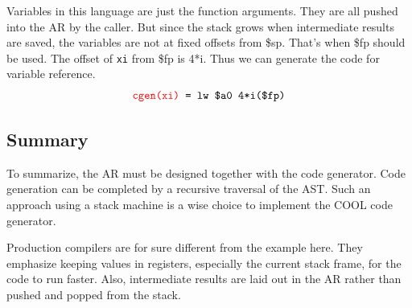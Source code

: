 Variables in this language are just the function arguments. They are all pushed into the AR by the caller. But since the stack grows when intermediate results are saved, the variables are not at fixed offsets from \$sp. That's when \$fp should be used. The offset of \texttt{xi} from \$fp is 4*i. Thus we can generate the code for variable reference. 
\begin{equation*}
\texttt{\color{red}cgen(xi)}\texttt{ = lw \$a0 4*i(\$fp)}
\end{equation*}
\subsection{Summary}
To summarize, the AR must be designed together with the code generator. Code generation can be completed by a recursive traversal of the AST. Such an approach using a stack machine is a wise choice to implement the COOL code generator. 

Production compilers are for sure different from the example here. They emphasize keeping values in registers, especially the current stack frame, for the code to run faster. Also, intermediate results are laid out in the AR rather than pushed and popped from the stack. 

